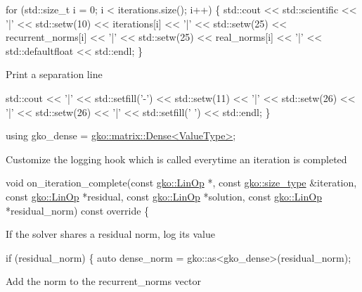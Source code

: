 \begin{DoxyCode}
\textcolor{keywordflow}{for} (std::size\_t i = 0; i < iterations.size(); i++) \{
    std::cout << std::scientific << \textcolor{charliteral}{'|'} << std::setw(10)
              << iterations[i] << \textcolor{charliteral}{'|'} << std::setw(25)
              << recurrent\_norms[i] << \textcolor{charliteral}{'|'} << std::setw(25)
              << real\_norms[i] << \textcolor{charliteral}{'|'} << std::defaultfloat << std::endl;
\}
\end{DoxyCode}


Print a separation line


\begin{DoxyCode}
    std::cout << \textcolor{charliteral}{'|'} << std::setfill(\textcolor{charliteral}{'-'}) << std::setw(11) << \textcolor{charliteral}{'|'}
              << std::setw(26) << \textcolor{charliteral}{'|'} << std::setw(26) << \textcolor{charliteral}{'|'}
              << std::setfill(\textcolor{charliteral}{' '}) << std::endl;
\}

\textcolor{keyword}{using} gko\_dense = \hyperlink{classgko_1_1matrix_1_1Dense}{gko::matrix::Dense<ValueType>};
\end{DoxyCode}


Customize the logging hook which is called everytime an iteration is completed


\begin{DoxyCode}
\textcolor{keywordtype}{void} on\_iteration\_complete(\textcolor{keyword}{const} \hyperlink{classgko_1_1LinOp}{gko::LinOp} *,
                           \textcolor{keyword}{const} \hyperlink{namespacegko_a6e5c95df0ae4e47aab2f604a22d98ee7}{gko::size\_type} &iteration,
                           \textcolor{keyword}{const} \hyperlink{classgko_1_1LinOp}{gko::LinOp} *residual,
                           \textcolor{keyword}{const} \hyperlink{classgko_1_1LinOp}{gko::LinOp} *solution,
                           \textcolor{keyword}{const} \hyperlink{classgko_1_1LinOp}{gko::LinOp} *residual\_norm)\textcolor{keyword}{ const override}
\textcolor{keyword}{}\{
\end{DoxyCode}


If the solver shares a residual norm, log its value


\begin{DoxyCode}
\textcolor{keywordflow}{if} (residual\_norm) \{
    \textcolor{keyword}{auto} dense\_norm = gko::as<gko\_dense>(residual\_norm);
\end{DoxyCode}


Add the norm to the {\ttfamily recurrent\+\_\+norms} vector


